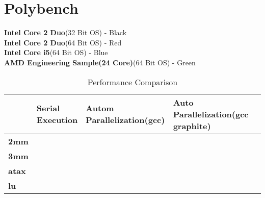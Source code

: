 \label{chap:testing}
\section{Polybench}
\textbf{Intel Core 2 Duo}(32 Bit OS) - Black \\
\textbf{Intel Core 2 Duo}(64 Bit OS) - Red   \\
\textbf{Intel Core i5}(64 Bit OS)    - Blue  \\
\textbf{AMD Engineering Sample(24 Core)}(64 Bit OS) - Green \\

\begin{table}[h]
\begin{center}
{\footnotesize
\begin{tabular}{| l | p{2cm} | p{2cm} | p{2cm} | p{2cm} |}
\hline
                  &\textbf{Serial Execution} & \textbf{Autom Parallelization(gcc)} & \textbf{Auto Parallelization(gcc graphite)} \\ \hline
\textbf{2mm}      &                          &                                     &                                    \\ \hline
\textbf{3mm}      &                          &                                     &                                    \\ \hline
\textbf{atax}     &                          &                                     &                                    \\ \hline
\textbf{lu}       &                          &                                     &                                     \\
\hline

\end{tabular}
}
\end{center}
\caption{Performance Comparison}
\end{table}

